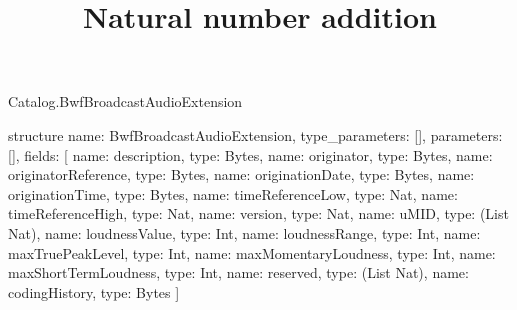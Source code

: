 \begin{lexlean}{Catalog.BwfBroadcastAudioExtension}
\title{Natural number addition}
\begin{semanticmodule}
structure{
  name: BwfBroadcastAudioExtension,
  type_parameters: [],
  parameters: [],
  fields: [
    {name: description, type: Bytes},
    {name: originator, type: Bytes},
    {name: originatorReference, type: Bytes},
    {name: originationDate, type: Bytes},
    {name: originationTime, type: Bytes},
    {name: timeReferenceLow, type: Nat},
    {name: timeReferenceHigh, type: Nat},
    {name: version, type: Nat},
    {name: uMID, type: (List Nat)},
    {name: loudnessValue, type: Int},
    {name: loudnessRange, type: Int},
    {name: maxTruePeakLevel, type: Int},
    {name: maxMomentaryLoudness, type: Int},
    {name: maxShortTermLoudness, type: Int},
    {name: reserved, type: (List Nat)},
    {name: codingHistory, type: Bytes}
  ]
}
\end{semanticmodule}
\end{lexlean}
